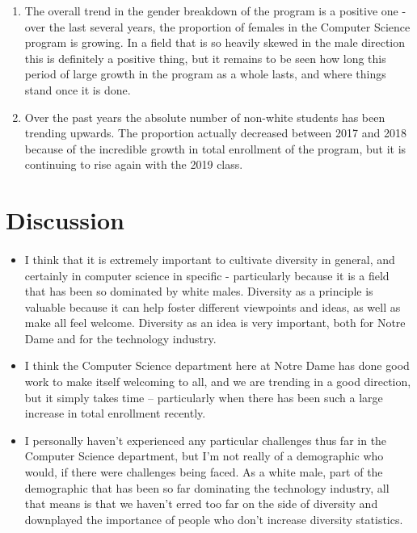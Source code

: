 \documentclass[letterpaper]{article}
\begin{document}
\begin{enumerate}

\item{}The overall trend in the gender breakdown of the program is a positive one - over the last several years, the proportion of females in the Computer Science program is growing. In a field that is so heavily skewed in the male direction this is definitely a positive thing, but it remains to be seen how long this period of large growth in the program as a whole lasts, and where things stand once it is done.

\item{}Over the past years the absolute number of non-white students has been trending upwards. The proportion actually decreased between 2017 and 2018 because of the incredible growth in total enrollment of the program, but it is continuing to rise again with the 2019 class.

\end{enumerate}


\paragraph{}


\section*{Discussion}

\paragraph{}

\begin{itemize}

\item{}I think that it is extremely important to cultivate diversity in general, and certainly in computer science in specific - particularly because it is a field that has been so dominated by white males. Diversity as a principle is valuable because it can help foster different viewpoints and ideas, as well as make all feel welcome. Diversity as an idea is very important, both for Notre Dame and for the technology industry.

\item{}I think the Computer Science department here at Notre Dame has done good work to make itself welcoming to all, and we are trending in a good direction, but it simply takes time -- particularly when there has been such a large increase in total enrollment recently.

\item{}I personally haven't experienced any particular challenges thus far in the Computer Science department, but I'm not really of a demographic who would, if there were challenges being faced. As a white male, part of the demographic that has been so far dominating the technology industry, all that means is that we haven't erred too far on the side of diversity and downplayed the importance of people who don't increase diversity statistics.

\end{itemize}
\end{document}
